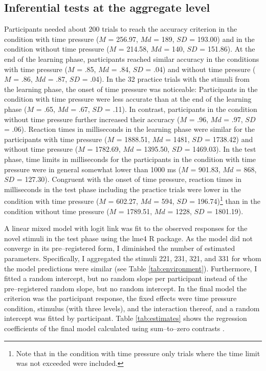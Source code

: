 \documentclass[a4paper,man,natbib]{apa6}
\begin{document}
\subsection{Inferential tests at the aggregate level}
Participants needed about 200 trials to reach the accuracy criterion in the condition with time pressure ($M$ = 256.97, $Md$ = 189, $SD$ = 193.00) and in the condition without time pressure ($M$ = 214.58, $Md$ = 140, $SD$ = 151.86). At the end of the learning phase, participants reached similar accuracy in the conditions with time pressure ($M$ = .85, $Md$ = .84, $SD$ = .04) and without time pressure ($M$ = .86, $Md$ = .87, $SD$ = .04). In the 32 practice trials with the stimuli from the learning phase, the onset of time pressure was noticeable: Participants in the condition with time pressure were less accurate than at the end of the learning phase ($M$ = .65, $Md$ = .67, $SD$ = .11). In contrast, participants in the condition without time pressure further increased their accuracy ($M$ = .96, $Md$ = .97, $SD$ = .06). Reaction times in milliseconds in the learning phase were similar for the participants with time pressure ($M$ = 1888.51, $Md$ = 1481, $SD$ = 1738.42) and without time pressure ($M$ = 1782.69, $Md$ = 1395.50, $SD$ = 1469.03). In the test phase, time limits in milliseconds for the participants in the condition with time pressure were in general somewhat lower than 1000 ms ($M$ = 901.83, $Md$ = 868, $SD$ = 127.30). Congruent with the onset of time pressure, reaction times in milliseconds in the test phase including the practice trials were lower in the condition with time pressure ($M$ = 602.27, $Md$ = 594, $SD$ = 196.74)\footnote{Note that in the condition with time pressure only trials where the time limit was not exceeded were included.} than in the condition without time pressure ($M$ = 1789.51, $Md$ = 1228, $SD$ = 1801.19). 

A linear mixed model with logit link was fit to the observed responses for the novel stimuli in the test phase using the lme4 R package. As the model did not converge in its pre--registered form, I diminished the number of estimated parameters. Specifically, I aggregated the stimuli 221, 231, 321, and 331 for whom the model predictions were similar (see Table \ref{tab:environment}). Furthermore, I fitted a random intercept, but no random slope per participant instead of the pre--registered random slope, but no random intercept. In the final model the criterion was the participant response, the fixed effects were time pressure condition, stimulus (with three levels), and the interaction thereof, and a random intercept was fitted by participant. Table \ref{tab:estimates} shows the regression coefficients of the final model calculated using sum--to--zero contrasts \citep{singmann2017introduction}. 
\end{document}
